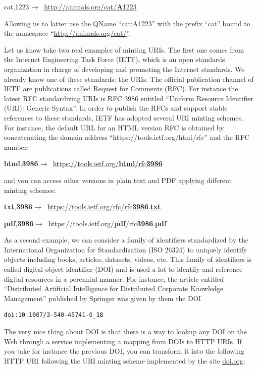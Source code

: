 cat,1223 →~
\href{http://animals.org/cat/A1223}{http://animals.org/cat/\textbf{A}1223}

Allowing us to latter use the QName ``cat:A1223'' with the prefix
``cat'' bound to the namespace ``\url{http://animals.org/cat/}''.

Let us know take two real examples of minting URIs. The first one comes
from the Internet Engineering Task Force (IETF), which is an open
standards organization in charge of developing and promoting the
Internet standards. We already know one of these standards: the URIs.
The official publication channel of IETF are publications called Request
for Comments (RFC). For instance the latest RFC standardizing URIs is
RFC 3986 entitled ``Uniform Resource Identifier (URI): Generic Syntax''.
In order to publish the RFCs and support stable references to these
standards, IETF has adopted several URI minting schemes. For instance,
the default URL for an HTML version RFC is obtained by concatenating the
domain address ``https://tools.ietf.org/html/rfc'' and the RFC number:

\textbf{html},\textbf{3986} →~
\href{https://tools.ietf.org/html/rfc3986}{https://tools.ietf.org/\textbf{html}/rfc\textbf{3986}}

and you can access other versions in plain text and PDF applying
different minting schemes:

\textbf{txt},\textbf{3986} →~
\href{https://tools.ietf.org/rfc/rfc3986.txt}{https://tools.ietf.org/rfc/rfc\textbf{3986}.\textbf{txt}}

\textbf{pdf},\textbf{3986} →~
https://tools.ietf.org/\textbf{pdf}/rfc\textbf{3986}.\textbf{pdf}

As a second example, we can consider a family of identifiers
standardized by the International Organization for Standardization (ISO
26324) to uniquely identify objects including books, articles, datasets,
videos, etc. This family of identifiers is called digital object
identifier (DOI) and is used a lot to identify and reference digital
resources in a perennial manner. For instance, the article entitled
``Distributed Artificial Intelligence for Distributed Corporate
Knowledge Management'' published by Springer was given by them the DOI

\begin{lstlisting}
doi:10.1007/3-540-45741-0_18
\end{lstlisting}


The very nice thing about DOI is that there is a way to lookup any DOI
on the Web through a service implementing a mapping from DOIs to HTTP
URIs. If you take for instance the previous DOI, you can transform it
into the following HTTP URI following the URI minting scheme implemented
by the site \href{https://www.doi.org/}{doi.org}:

